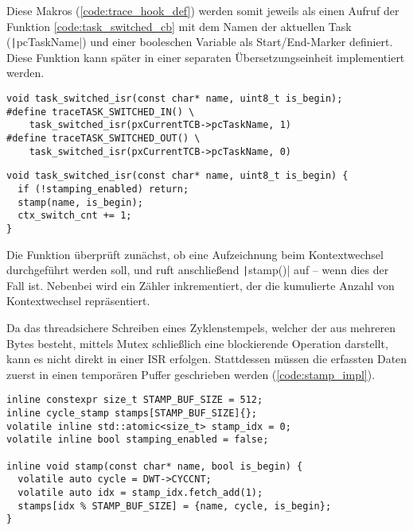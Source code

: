 Diese Makros (\ref{code:trace_hook_def}) werden somit jeweils als einen Aufruf
der Funktion \ref{code:task_switched_cb} mit dem Namen der aktuellen Task
(\texttt|pcTaskName|) und einer booleschen Variable als
Start/End-Marker definiert. Diese Funktion kann später in einer separaten
Übersetzungseinheit implementiert werden.

\begin{code}
\begin{verbatim}
void task_switched_isr(const char* name, uint8_t is_begin);
#define traceTASK_SWITCHED_IN() \
    task_switched_isr(pxCurrentTCB->pcTaskName, 1)
#define traceTASK_SWITCHED_OUT() \
    task_switched_isr(pxCurrentTCB->pcTaskName, 0)
\end{verbatim}
    \label{code:trace_hook_def}
\end{code}

\begin{code}
\begin{verbatim}
void task_switched_isr(const char* name, uint8_t is_begin) {
  if (!stamping_enabled) return;
  stamp(name, is_begin);
  ctx_switch_cnt += 1;
}
\end{verbatim}
    \label{code:task_switched_cb}
\end{code}

Die Funktion überprüft zunächst, ob eine Aufzeichnung beim Kontextwechsel
durchgeführt werden soll, und ruft anschließend \texttt|stamp()| auf --
wenn dies der Fall ist. Nebenbei wird ein Zähler inkrementiert, der die
kumulierte Anzahl von Kontextwechsel repräsentiert.

Da das threadsichere Schreiben eines Zyklenstempels, welcher der aus mehreren
Bytes besteht, mittels Mutex schließlich eine blockierende Operation darstellt,
kann es nicht direkt in einer ISR erfolgen. Stattdessen müssen die erfassten
Daten zuerst in einen temporären Puffer geschrieben werden
(\ref{code:stamp_impl}).

\begin{code}
\begin{verbatim}
inline constexpr size_t STAMP_BUF_SIZE = 512;
inline cycle_stamp stamps[STAMP_BUF_SIZE]{};
volatile inline std::atomic<size_t> stamp_idx = 0;
volatile inline bool stamping_enabled = false;

inline void stamp(const char* name, bool is_begin) {
  volatile auto cycle = DWT->CYCCNT;
  volatile auto idx = stamp_idx.fetch_add(1);
  stamps[idx % STAMP_BUF_SIZE] = {name, cycle, is_begin};
}
\end{verbatim}
    \label{code:stamp_impl}
\end{code}

